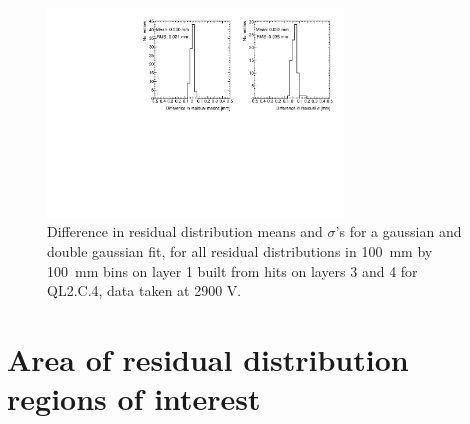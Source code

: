 \begin{figure}
    \centering
    \includegraphics[width = 0.7\textwidth]{figures/figure_compare_residual_fits_QL2C04_2900V_2021-02-08_2_fit_range_mean_pm_RMS_minus_quick_and_dirty_2900V_log_scale_layer1_fixedlayers34.pdf} 
    \caption{Difference in residual distribution means and $\sigma$'s for a gaussian and double gaussian fit, for all residual distributions in \SI{100}{\milli\meter} by \SI{100}{\milli\meter} bins on layer 1 built from hits on layers 3 and 4 for QL2.C.4, data taken at 2900 V.}
    \label{fig:double_gaussian_compare_fits}
\end{figure}

\section{Area of residual distribution regions of interest}
\label{appendix:systematics_bin_size}


